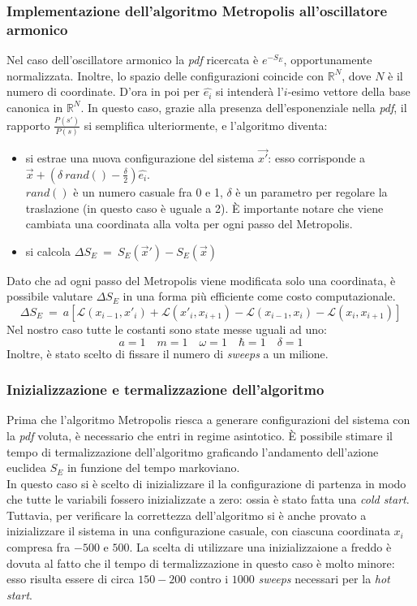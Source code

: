 \subsubsection{Implementazione dell'algoritmo Metropolis all'oscillatore armonico}
Nel caso dell'oscillatore armonico la \emph{pdf} ricercata è $ e^{-S_E}$, opportunamente normalizzata.
Inoltre, lo spazio delle configurazioni coincide con $\mathbb{R}^N$, dove $N$ è il numero di coordinate. D'ora in poi per $\hat{e_i}$ si intenderà l'$i$-esimo vettore
della base canonica in $\mathbb{R}^N$.
In questo caso, grazie alla presenza dell'esponenziale nella \emph{pdf},
il rapporto $ \frac{P(s')}{P(s)}$ si semplifica ulteriormente, e l'algoritmo diventa:
\begin{itemize}
 \item si estrae una nuova configurazione del sistema $\vec{x'}$: esso corrisponde a $\vec{x} + \left(\delta \ rand() - \frac{\delta}{2}\right)\hat{e_i}$.
  \\
  $rand()$ è un numero casuale fra 0 e 1, $\delta$ è un parametro per regolare la traslazione (in questo caso è uguale a 2).
  È importante notare che viene cambiata una coordinata alla volta per ogni passo del Metropolis.
 \item si calcola $\Delta S_E \ = \ S_E(\vec{x}') -S_E(\vec{x})$
\end{itemize}
Dato che ad ogni passo del Metropolis viene modificata solo una coordinata, è possibile valutare $\Delta S_E$ in una forma più efficiente come costo computazionale.
\begin{equation*}
\Delta S_E \ = \ a[\mathcal{L}(x_{i-1},x'_{i})+\mathcal{L}(x'_{i},x_{i+1})-\mathcal{L}(x_{i-1},x_{i})-\mathcal{L}(x_{i},x_{i+1})]    
\end{equation*}
Nel nostro caso tutte le costanti sono state messe uguali ad uno:
$$ a=1 \quad m = 1 \quad \omega = 1 \quad  \hbar = 1 \quad \delta = 1 $$
Inoltre, è stato scelto di fissare il numero di \emph{sweeps} a un milione.
\subsubsection{Inizializzazione e termalizzazione dell'algoritmo}
Prima che l'algoritmo Metropolis riesca a generare configurazioni del sistema con la \emph{pdf} voluta, è necessario che entri in regime asintotico.
È possibile stimare il tempo di termalizzazione dell'algoritmo graficando l'andamento dell'azione euclidea $S_E$ in funzione del tempo markoviano.\\
In questo caso si è scelto di inizializzare il la configurazione di partenza in modo che tutte le variabili fossero inizializzate a zero: ossia è stato fatta una
\emph{cold start}. Tuttavia, per verificare la correttezza dell'algoritmo si è anche provato a inizializzare il sistema in una configurazione casuale,
con ciascuna coordinata $x_i$ compresa fra $-500$ e $500$. La scelta di utilizzare una inizializzaione a freddo è dovuta al fatto che il tempo di termalizzazione in questo caso è molto minore:
esso risulta essere di circa $150-200$ contro i $1000$ \emph{sweeps} necessari per la \emph{hot start}.

